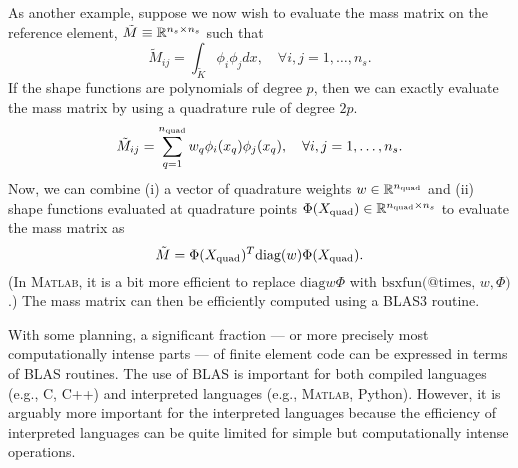As another example, suppose we now wish to evaluate the mass matrix on the reference element, $\tilde M \equiv \mathbb{R}^{n_s \times n_s}$ such that
\begin{equation*}
  \tilde M_{ij} = \int_{\tilde K} \phi_i \phi_j dx, \quad \forall i,j = 1,\dots,n_s.
\end{equation*}
If the shape functions are polynomials of degree $p$, then we can exactly evaluate the mass matrix by using a quadrature rule of degree $2p$.
\begin{equation*}
  \tilde M_{ij} = \sum_{q=1}^{n_{\rm quad}} w_q \phi_i(x_q) \phi_j(x_q), \quad \forall i,j = 1,\dots,n_s.
\end{equation*}
Now, we can combine (i) a vector of quadrature weights $w \in \mathbb{R}^{n_{\rm quad}}$ and (ii) shape functions evaluated at quadrature points $\Phi(X_{\rm quad}) \in \mathbb{R}^{n_{\rm quad} \times n_s}$ to evaluate the mass matrix as
\begin{equation*}
  \tilde M = \Phi(X_{\rm quad})^T \text{diag}(w) \Phi(X_{\rm quad}).
\end{equation*}
(In \textsc{Matlab}, it is a bit more efficient to replace $\text{diag} w \Phi$ with $\text{bsxfun(@times, } w,\Phi)$.) The mass matrix can then be efficiently computed using a BLAS3 routine.

With some planning, a significant fraction --- or more precisely most computationally intense parts --- of finite element code can be expressed in terms of BLAS routines. The use of BLAS is important for both compiled languages (e.g., C, C++) and interpreted languages (e.g., \textsc{Matlab}, Python).  However, it is arguably more important for the interpreted languages because the efficiency of interpreted languages can be quite limited for simple but computationally intense operations.

